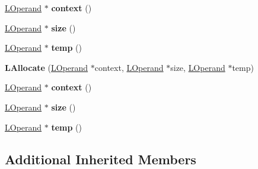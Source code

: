 \begin{DoxyCompactItemize}
\item 
\hyperlink{classv8_1_1internal_1_1_l_operand}{L\+Operand} $\ast$ {\bfseries context} ()\hypertarget{classv8_1_1internal_1_1_l_allocate_a8e8d6f1d4913d84b1ecf49b67200b7a5}{}\label{classv8_1_1internal_1_1_l_allocate_a8e8d6f1d4913d84b1ecf49b67200b7a5}

\item 
\hyperlink{classv8_1_1internal_1_1_l_operand}{L\+Operand} $\ast$ {\bfseries size} ()\hypertarget{classv8_1_1internal_1_1_l_allocate_a39b42c01160d1f69ebea869bc4b92efe}{}\label{classv8_1_1internal_1_1_l_allocate_a39b42c01160d1f69ebea869bc4b92efe}

\item 
\hyperlink{classv8_1_1internal_1_1_l_operand}{L\+Operand} $\ast$ {\bfseries temp} ()\hypertarget{classv8_1_1internal_1_1_l_allocate_a9067b20a98db902ea392d4bdd3b29fe9}{}\label{classv8_1_1internal_1_1_l_allocate_a9067b20a98db902ea392d4bdd3b29fe9}

\item 
{\bfseries L\+Allocate} (\hyperlink{classv8_1_1internal_1_1_l_operand}{L\+Operand} $\ast$context, \hyperlink{classv8_1_1internal_1_1_l_operand}{L\+Operand} $\ast$size, \hyperlink{classv8_1_1internal_1_1_l_operand}{L\+Operand} $\ast$temp)\hypertarget{classv8_1_1internal_1_1_l_allocate_a209c4f2b3724dbd7d16031c72c35931b}{}\label{classv8_1_1internal_1_1_l_allocate_a209c4f2b3724dbd7d16031c72c35931b}

\item 
\hyperlink{classv8_1_1internal_1_1_l_operand}{L\+Operand} $\ast$ {\bfseries context} ()\hypertarget{classv8_1_1internal_1_1_l_allocate_a8e8d6f1d4913d84b1ecf49b67200b7a5}{}\label{classv8_1_1internal_1_1_l_allocate_a8e8d6f1d4913d84b1ecf49b67200b7a5}

\item 
\hyperlink{classv8_1_1internal_1_1_l_operand}{L\+Operand} $\ast$ {\bfseries size} ()\hypertarget{classv8_1_1internal_1_1_l_allocate_a39b42c01160d1f69ebea869bc4b92efe}{}\label{classv8_1_1internal_1_1_l_allocate_a39b42c01160d1f69ebea869bc4b92efe}

\item 
\hyperlink{classv8_1_1internal_1_1_l_operand}{L\+Operand} $\ast$ {\bfseries temp} ()\hypertarget{classv8_1_1internal_1_1_l_allocate_a9067b20a98db902ea392d4bdd3b29fe9}{}\label{classv8_1_1internal_1_1_l_allocate_a9067b20a98db902ea392d4bdd3b29fe9}

\end{DoxyCompactItemize}
\subsection*{Additional Inherited Members}



